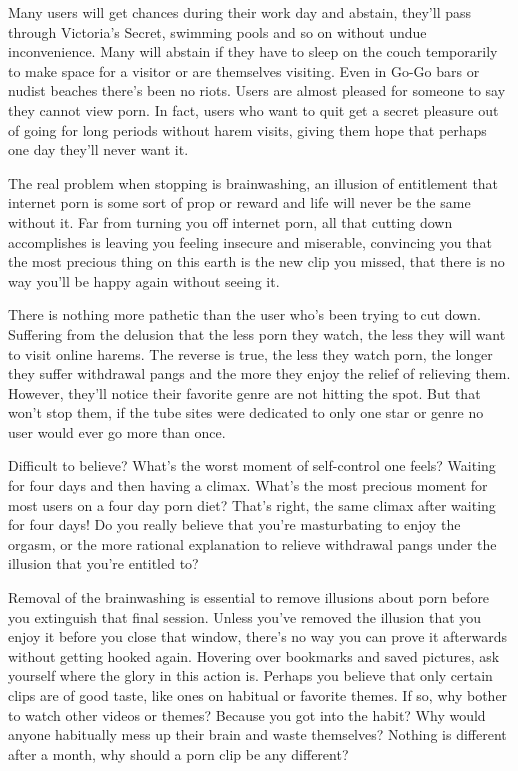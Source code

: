 \documentclass[easypeasy.tex]{subfiles}
\begin{document}
Many users will get chances during their work day and abstain, they'll pass through Victoria's Secret, swimming pools and so on without undue inconvenience. Many will abstain if they have to sleep on the couch temporarily to make space for a visitor or are themselves visiting. Even in Go-Go bars or nudist beaches there's been no riots. Users are almost pleased for someone to say they cannot view porn. In fact, users who want to quit get a secret pleasure out of going for long periods without harem visits, giving them hope that perhaps one day they'll never want it.

The real problem when stopping is brainwashing, an illusion of entitlement that internet porn is some sort of prop or reward and life will never be the same without it. Far from turning you off internet porn, all that cutting down accomplishes is leaving you feeling insecure and miserable, convincing you that the most precious thing on this earth is the new clip you missed, that there is no way you'll be happy again without seeing it.

There is nothing more pathetic than the user who's been trying to cut down. Suffering from the delusion that the less porn they watch, the less they will want to visit online harems. The reverse is true, the less they watch porn, the longer they suffer withdrawal pangs and the more they enjoy the relief of relieving them. However, they'll notice their favorite genre are not hitting the spot. But that won't stop them, if the tube sites were dedicated to only one star or genre no user would ever go more than once.

Difficult to believe? What's the worst moment of self-control one feels? Waiting for four days and then having a climax. What's the most precious moment for most users on a four day porn diet? That's right, the same climax after waiting for four days! Do you really believe that you're masturbating to enjoy the orgasm, or the more rational explanation to relieve withdrawal pangs under the illusion that you're entitled to?

Removal of the brainwashing is essential to remove illusions about porn before you extinguish that final session. Unless you've removed the illusion that you enjoy it before you close that window, there's no way you can prove it afterwards without getting hooked again. Hovering over bookmarks and saved pictures, ask yourself where the glory in this action is. Perhaps you believe that only certain clips are of good taste, like ones on habitual or favorite themes. If so, why bother to watch other videos or themes? Because you got into the habit? Why would anyone habitually mess up their brain and waste themselves? Nothing is different after a month, why should a porn clip be any different?
\end{document}
